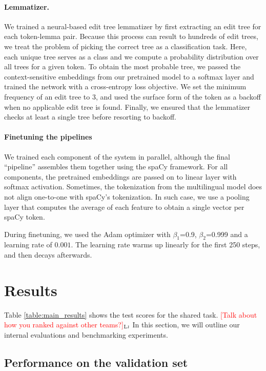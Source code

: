 \documentclass[11pt]{article}
\newcommand{\draftonly}[1]{#1}
\newcommand{\draftcomment}[3]{\draftonly{\textcolor{#2}{[#3]{$_{\textsc{#1}}$}}}}
\newcommand{\lj}[1]{\draftcomment{Lj}{red}{#1}}
\begin{document}
\paragraph{Lemmatizer.} 
We trained a neural-based edit tree lemmatizer \cite{muller-etal-2015-joint} by first extracting an edit tree for each token-lemma pair.
Because this process can result to hundreds of edit trees, we treat the problem of picking the correct tree as a classification task.
Here, each unique tree serves as a class and we compute a probability distribution over all trees for a given token.
To obtain the most probable tree, we passed the context-sensitive embeddings from our pretrained model to a softmax layer and trained the network with a cross-entropy loss objective.
We set the minimum frequency of an edit tree to 3, and used the surface form of the token as a backoff when no applicable edit tree is found.
Finally, we ensured that the lemmatizer checks at least a single tree before resorting to backoff. 

\paragraph{Finetuning the pipelines} We trained each component of the system in parallel, although the final ``pipeline'' assembles them together using the spaCy framework.
For all components, the pretrained embeddings are passed on to linear layer with softmax activation.
Sometimes, the tokenization from the multilingual model does not align one-to-one with spaCy's tokenization.
In such case, we use a pooling layer that computes the average of each feature to obtain a single vector per spaCy token.

During finetuning, we used the Adam optimizer with $\beta_1$=0.9, $\beta_2$=0.999 and a learning rate of $0.001$.
The learning rate warms up linearly for the first 250 steps, and then decays afterwards.

\section{Results}

Table \ref{table:main_results} shows the test scores for the shared task.
\lj{Talk about how you ranked against other teams?}
In this section, we will outline our internal evaluations and benchmarking experiments.

\subsection{Performance on the validation set}
\end{document}
